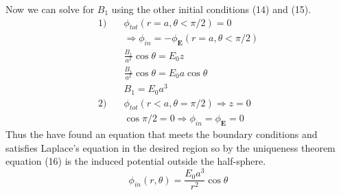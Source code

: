 \documentclass[a4paper, 11pt]{article}
\begin{document}
Now we can solve for $B_1$ using the other initial conditions (14) and (15).
\begin{align*}
	1) \quad &\phi_{tot}(r=a, \theta < \pi/2) = 0\\ 
	&\Rightarrow \phi_{in} = -\phi_{\mathbf{E}}(r=a, \theta < \pi/2)\\
	&\frac{B_1}{a^2}\cos{\theta} = E_0z \\ 
	&\frac{B_1}{a^2}\cos{\theta} = E_0a\cos{\theta}\\ 
	&B_1 = E_0a^3 \\ 
	2) \quad &\phi_{tot}(r < a, \theta = \pi/2) \Rightarrow z = 0\\ 
	& \cos{\pi/2} = 0 \Rightarrow \phi_{in} = \phi_{\mathbf{E}} = 0
\end{align*}
Thus the have found an equation that meets the boundary conditions and satisfies Laplace's equation in the desired region so by the uniqueness theorem equation (16) is the induced potential outside the half-sphere. 
\begin{equation}
	\phi_{in}(r,\theta) = \frac{E_0a^3}{r^2}\cos{\theta}
\end{equation}
\end{document}
